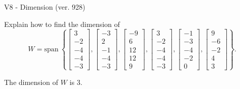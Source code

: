 \begin{exercise}
  \begin{exerciseTitle}V8 - Dimension (ver. 928)\end{exerciseTitle}
  \begin{exerciseStatement}
    Explain how to find the dimension of 
\[W=\mathrm{span}\ \left\{\left[\begin{array}{r}
3 \\
-2 \\
-4 \\
-4 \\
-3
\end{array}\right] , \left[\begin{array}{r}
-3 \\
2 \\
-1 \\
-4 \\
-3
\end{array}\right] , \left[\begin{array}{r}
-9 \\
6 \\
12 \\
12 \\
9
\end{array}\right] , \left[\begin{array}{r}
3 \\
-2 \\
-4 \\
-4 \\
-3
\end{array}\right] , \left[\begin{array}{r}
-1 \\
-3 \\
-4 \\
-2 \\
0
\end{array}\right] , \left[\begin{array}{r}
9 \\
-6 \\
-2 \\
4 \\
3
\end{array}\right]\right\}.\]



  \end{exerciseStatement}
  \begin{exerciseAnswer}
   The dimension of \(W\) is  \(3\).
  


  \end{exerciseAnswer}
\end{exercise}